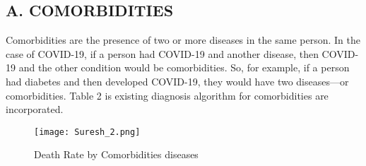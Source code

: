 \subsection*{A. COMORBIDITIES} 
Comorbidities are the presence of two or more diseases in the same person. In the case of COVID-19, if a 
person had COVID-19 and another disease, then COVID-19 and the other condition would be comorbidities. 
So, for example, if a person had diabetes and then developed COVID-19, they would have two diseases—or 
comorbidities. 
\newline 
Table 2 is existing diagnosis algorithm for comorbidities are incorporated. 
\begin{figure*}[htp] 
\centering 
\texttt{[image: Suresh\_2.png]} 
\caption{Death Rate by Comorbidities diseases} 
\label{fig:f2} 
\end{figure*} 
